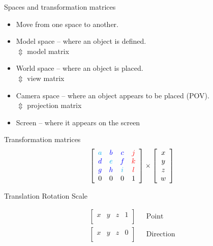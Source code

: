 \documentclass[12pt]{article}
\begin{document}
\begin{frame}{Spaces and transformation matrices}
\begin{itemize}
\item Move from one space to another.

\item Model space -- where an object is
  defined.\\\hspace{10em}$\Updownarrow$ {\small\color{red} model matrix}
\vspace{-1.8em}
\item World space -- where an object is placed.\\\hspace{10em}$\Updownarrow$ {\small\color{red} view matrix}
\vspace{-1.8em}
\item Camera space -- where an object appears to be placed (POV).\\\hspace{10em}$\Updownarrow$ {\small\color{red} projection matrix}
\vspace{-1.8em}
\item Screen -- where it appears on the screen
\end{itemize}
\end{frame}

\begin{frame}{Transformation matrices}
\begin{gather*}
\left[\begin{array}{cccc}
        \color{cyan}a & \color{blue}b & \color{blue}c & \color{red}j \\
        \color{blue}d & \color{cyan}e & \color{blue}f & \color{red}k \\
        \color{blue}g & \color{blue}h & \color{cyan}i & \color{red}l \\
        0 & 0 & 0 & 1
      \end{array}\right]\times\left[\begin{array}{c}x\\ y \\z \\w\end{array}\right]
  \end{gather*}

\hfill
{\color{red}Translation} \hfill
{\color{blue}Rotation} \hfill
{\color{green}Scale} \hfill~


\begin{align*}
\left[\begin{array}{cccc}x & y & z & 1\\\end{array}\right]&
~~~\text{Point} \\
\left[\begin{array}{cccc}x & y & z & 0\\\end{array}\right]&
~~~\text{Direction}
\end{align*}

\end{frame}
\end{document}
